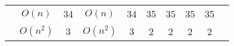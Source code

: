 \begin{table}[ht]
{\begin{tabular}{ >{\scriptsize}c | >{\scriptsize}c | >{\scriptsize}c | >{\scriptsize}c | c | c | c | c | c | c }
        \hline \hline
        \multirow{3}{*}{Tianhan} 
        & $O(n)$       & 34     & $O(n) $ & 34 & 35 & 35 & 35 & 35 \\
        \cline{2-9}
        & $O(n^2)$      & 3    &  $O(n^2)$  & 3 & 2 & 2 & 2 & 2 \\
        \hline
        \end{tabular}
        }
    \end{table}
    